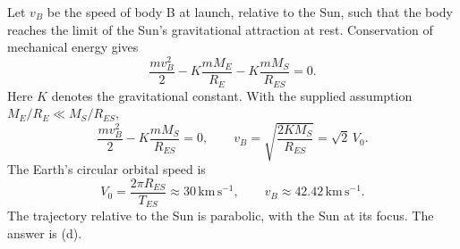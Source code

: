 Let $v_B$ be the speed of body B at launch, relative to the Sun, such that
the body reaches the limit of the Sun's gravitational attraction at rest.
Conservation of mechanical energy gives
\[
\frac{mv_B^2}{2}-K\frac{mM_E}{R_E}-K\frac{mM_S}{R_{ES}}=0.
\]
Here $K$ denotes the gravitational constant. With the supplied assumption
$M_E/R_E\ll M_S/R_{ES}$,
\[
\frac{mv_B^2}{2}-K\frac{mM_S}{R_{ES}}=0,\qquad
v_B=\sqrt{\frac{2KM_S}{R_{ES}}}=\sqrt2\,V_0.
\]
The Earth's circular orbital speed is
\[
V_0=\frac{2\pi R_{ES}}{T_{ES}}\approx30\,\mathrm{km\,s^{-1}},\qquad
v_B\approx42.42\,\mathrm{km\,s^{-1}}.
\]
The trajectory relative to the Sun is parabolic, with the Sun at its focus.
The answer is (d).
